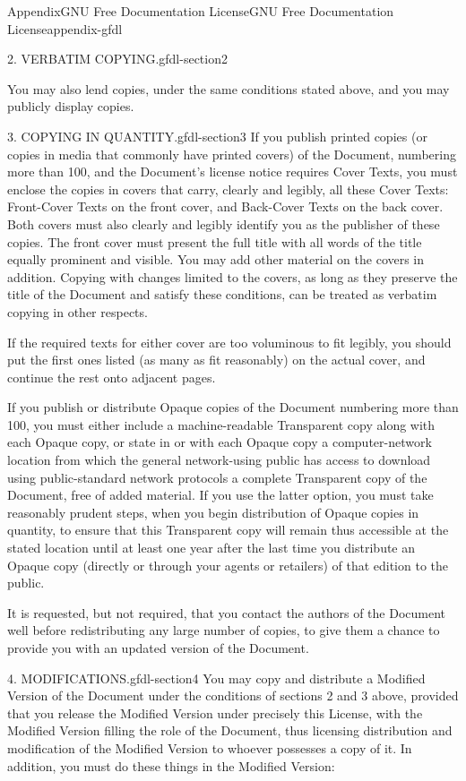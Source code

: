 \documentclass[oneside,10pt,]{book}
\numberwithin{equation}{section}
\begin{document}
\begin{appendixptx}{Appendix}{GNU Free Documentation License}{}{GNU Free Documentation License}{}{}{appendix-gfdl}
\begin{paragraphs}{2. VERBATIM COPYING.}{gfdl-section2}
\par
You may also lend copies, under the same conditions stated above, and you may publicly display copies.%
\end{paragraphs}%
\begin{paragraphs}{3. COPYING IN QUANTITY.}{gfdl-section3}%
If you publish printed copies (or copies in media that commonly have printed covers) of the Document, numbering more than 100, and the Document's license notice requires Cover Texts, you must enclose the copies in covers that carry, clearly and legibly, all these Cover Texts: Front-Cover Texts on the front cover, and Back-Cover Texts on the back cover. Both covers must also clearly and legibly identify you as the publisher of these copies. The front cover must present the full title with all words of the title equally prominent and visible. You may add other material on the covers in addition. Copying with changes limited to the covers, as long as they preserve the title of the Document and satisfy these conditions, can be treated as verbatim copying in other respects.%
\par
If the required texts for either cover are too voluminous to fit legibly, you should put the first ones listed (as many as fit reasonably) on the actual cover, and continue the rest onto adjacent pages.%
\par
If you publish or distribute Opaque copies of the Document numbering more than 100, you must either include a machine-readable Transparent copy along with each Opaque copy, or state in or with each Opaque copy a computer-network location from which the general network-using public has access to download using public-standard network protocols a complete Transparent copy of the Document, free of added material. If you use the latter option, you must take reasonably prudent steps, when you begin distribution of Opaque copies in quantity, to ensure that this Transparent copy will remain thus accessible at the stated location until at least one year after the last time you distribute an Opaque copy (directly or through your agents or retailers) of that edition to the public.%
\par
It is requested, but not required, that you contact the authors of the Document well before redistributing any large number of copies, to give them a chance to provide you with an updated version of the Document.%
\end{paragraphs}%
\begin{paragraphs}{4. MODIFICATIONS.}{gfdl-section4}%
You may copy and distribute a Modified Version of the Document under the conditions of sections 2 and 3 above, provided that you release the Modified Version under precisely this License, with the Modified Version filling the role of the Document, thus licensing distribution and modification of the Modified Version to whoever possesses a copy of it. In addition, you must do these things in the Modified Version:%

\end{paragraphs}
\end{appendixptx}
\end{document}
